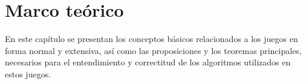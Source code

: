 \chapter{Marco teórico}

En este capítulo se presentan los conceptos básicos relacionados a los juegos en forma normal y extensiva, así como las proposiciones y los teoremas principales, necesarios para el entendimiento y correctitud de los algoritmos utilizados en estos juegos.



